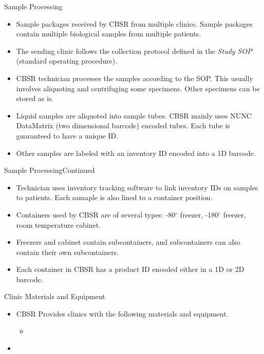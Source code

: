\documentclass{beamer}
\begin{document}
\begin{frame}{Sample Processing}{}
  \begin{itemize}
    \item Sample packages received by CBSR from multiple clinics. Sample
      packages contain multiple biological samples from multiple patients.
    \item The sending clinic follows the collection protocol defined in the
      \emph{Study SOP} (standard operating procedure).
    \item CBSR technician processes the samples according to the SOP. This
      usually involves aliquoting and centrifuging some specimens. Other
      specimens can be stored as is.
    \item Liquid samples are aliquoted into sample tubes. CBSR mainly uses NUNC
      DataMatrix (two dimensional barcode) encoded tubes. Each tube is
      guaranteed to have a unique ID.
    \item Other samples are labeled with an inventory ID encoded into a 1D
      barcode.
  \end{itemize}
\end{frame}

\begin{frame}{Sample Processing}{Continued}
  \begin{itemize}
    \item Technician uses inventory tracking software to link inventory IDs on
      samples to patients. Each samaple is also lined to a container position.
    \item Containers used by CBSR are of several types: -80$^\circ$ freezer,
      -180$^\circ$ freezer, room temperature cabinet.
    \item Freezers and cabinet contain subcontainers, and subcontainers can
      also contain their own subcontainers.
    \item Each container in CBSR has a product ID encoded either in a 1D or 2D
      barcode.
  \end{itemize}
\end{frame}

\begin{frame}{Clinic Materials and Equipment}{}
  \begin{itemize}
    \item CBSR Provides clinics with the following materials and equipment.
      \begin{itemize}
        \item
      \end{itemize}
  \end{itemize}
\end{frame}

\begin{frame}{}{}
  \begin{itemize}
    \item
  \end{itemize}
\end{frame}
\end{document}
